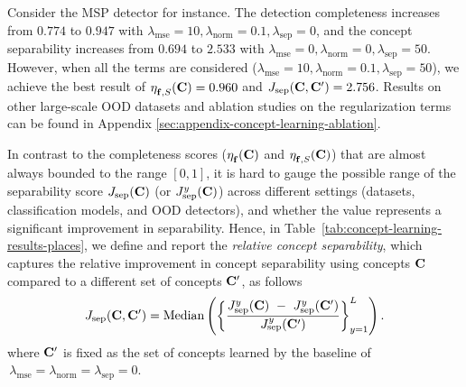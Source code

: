 Consider the MSP detector for instance. The detection completeness increases from $0.774$ to $0.947$ with $\lambda_\textrm{mse} = 10, \lambda_\textrm{norm} = 0.1, \lambda_\textrm{sep} = 0$, and the concept separability increases from $0.694$ to $2.533$ with $\lambda_\textrm{mse} = 0, \lambda_\textrm{norm} = 0, \lambda_\textrm{sep} = 50$.
However, when all the terms are considered ($\lambda_\textrm{mse} = 10, \lambda_\textrm{norm} = 0.1, \lambda_\textrm{sep} = 50$), we achieve the best result of $\eta^{}_{\mathbf{f}, S}(\mathbf{C}) = 0.960$ and $J_{\textrm{sep}}(\mathbf{C}, \mathbf{C}') = 2.756$. 
Results on other large-scale OOD datasets and ablation studies on the regularization terms can be found in Appendix \ref{sec:appendix-concept-learning-ablation}.

\iffalse

In contrast to the completeness scores (\ie $\eta^{}_{\mathbf{f}}(\mathbf{C})$ and $\eta^{}_{\mathbf{f}, S}(\mathbf{C})$) that are almost always bounded to the range $[0, 1]$, it is hard to gauge the possible range of the separability score $J_{\textrm{sep}}(\mathbf{C})$ (or $J^y_{\textrm{sep}}(\mathbf{C})$) across different settings (datasets, classification models, and OOD detectors), and whether the value represents a significant improvement in separability.
Hence, in Table~\ref{tab:concept-learning-results-places}, we define and report the \textit{relative concept separability}, which captures the relative improvement in concept separability using concepts $\mathbf{C}$ compared to a different set of concepts $\mathbf{C}'$, as follows
\begin{equation}
\label{eq:relative-separability}
J_{\textrm{sep}}(\mathbf{C}, \mathbf{C}') = \textrm{Median}\left( \left\{\frac{J^y_{\textrm{sep}}(\mathbf{C}) ~-~ J^y_{\textrm{sep}}(\mathbf{C}')}{J^y_{\textrm{sep}}(\mathbf{C}')}\right\}_{y=1}^L \right). 
\end{equation}
where $\mathbf{C}'$ is fixed as the set of concepts learned by the baseline of $\,\lambda_\textrm{mse} = \lambda_\textrm{norm} = \lambda_\textrm{sep} = 0$.

